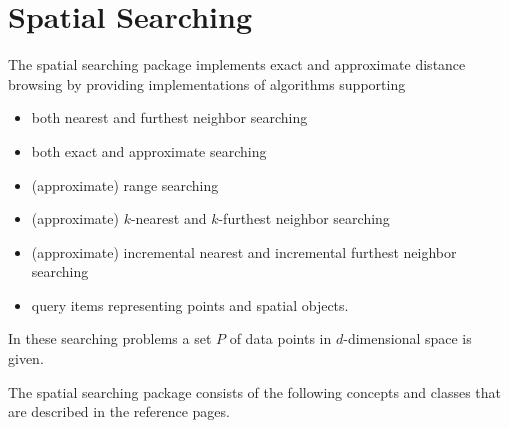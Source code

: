 \chapter{Spatial Searching}

The spatial searching package implements
exact and approximate distance browsing
by providing implementations of algorithms supporting

\begin{itemize} 

\item
both nearest and furthest neighbor searching

\item
both exact and approximate searching

\item
(approximate) range searching

\item 
(approximate) $k$-nearest and $k$-furthest neighbor searching

\item 
(approximate) incremental nearest and incremental furthest neighbor searching

\item
query items representing points and spatial objects.

\end{itemize}

In these searching problems a set $P$ of data points in $d$-dimensional
space is given.

The spatial searching package 
consists of the following concepts and classes
that are described in the reference pages.



 \\
 \\ 
 \\
 \\
 \\
 \\
 \\
 \\
 \\
 \\
 \\

